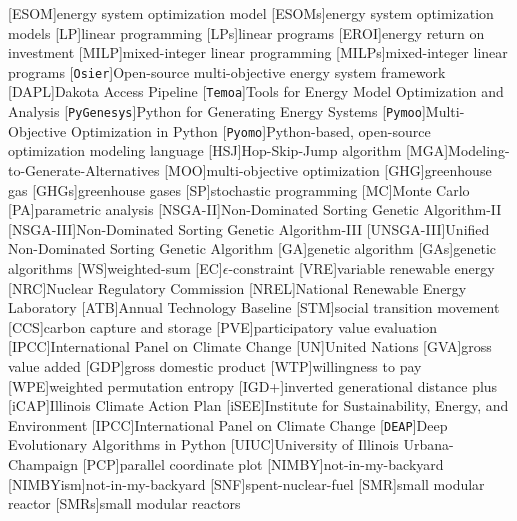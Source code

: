 [ESOM]{energy system optimization model}
[ESOMs]{energy system optimization models}
[LP]{linear programming}
[LPs]{linear programs}
[EROI]{energy return on investment}
[MILP]{mixed-integer linear programming}
[MILPs]{mixed-integer linear programs}
[\texttt{Osier}]{Open-source multi-objective energy system framework}
[DAPL]{Dakota Access Pipeline}
[\texttt{Temoa}]{Tools for Energy Model Optimization and Analysis}
[\texttt{PyGenesys}]{Python for Generating Energy Systems}
[\texttt{Pymoo}]{Multi-Objective Optimization in Python}
[\texttt{Pyomo}]{Python-based, open-source optimization modeling language}
[HSJ]{Hop-Skip-Jump algorithm}
[MGA]{Modeling-to-Generate-Alternatives}
[MOO]{multi-objective optimization}
[GHG]{greenhouse gas}
[GHGs]{greenhouse gases}
[SP]{stochastic programming}
[MC]{Monte Carlo}
[PA]{parametric analysis}
[NSGA-II]{Non-Dominated Sorting Genetic Algorithm-II}
[NSGA-III]{Non-Dominated Sorting Genetic Algorithm-III}
[UNSGA-III]{Unified Non-Dominated Sorting Genetic Algorithm}
[GA]{genetic algorithm}
[GAs]{genetic algorithms}
[WS]{weighted-sum}
[EC]{$\epsilon$-constraint}
[VRE]{variable renewable energy}
[NRC]{Nuclear Regulatory Commission}
[NREL]{National Renewable Energy Laboratory}
[ATB]{Annual Technology Baseline}
[STM]{social transition movement}
[CCS]{carbon capture and storage}
[PVE]{participatory value evaluation}
[IPCC]{International Panel on Climate Change}
[UN]{United Nations}
[GVA]{gross value added}
[GDP]{gross domestic product}
[WTP]{willingness to pay}
[WPE]{weighted permutation entropy}
[IGD+]{inverted generational distance plus}
[iCAP]{Illinois Climate Action Plan}
[iSEE]{Institute for Sustainability, Energy, and Environment}
[IPCC]{International Panel on Climate Change}
[\texttt{DEAP}]{Deep Evolutionary Algorithms in Python}
[UIUC]{University of Illinois Urbana-Champaign}
[PCP]{parallel coordinate plot}
[NIMBY]{not-in-my-backyard}
[NIMBYism]{not-in-my-backyard}
[SNF]{spent-nuclear-fuel}
[SMR]{small modular reactor}
[SMRs]{small modular reactors}
